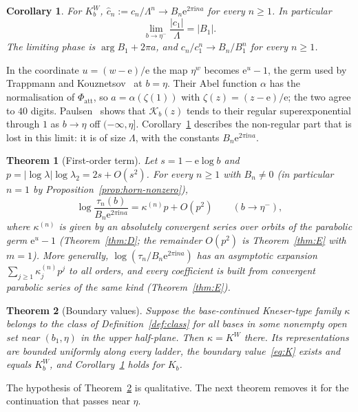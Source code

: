 \documentclass[11pt]{amsart}
\newtheorem{corollary}[theorem]{Corollary}
\newtheorem{maintheorem}{Theorem}
\theoremstyle{definition}
\newcommand{\Kk}{K}
\newcommand{\eee}{\mathrm{e}}
\newcommand{\ii}{\mathrm{i}}
\begin{document}
\begin{corollary}\label{cor:limits}
For $\Kk^W_b$, $\hat c_n:=c_n/\Lambda^n\to B_n\eee^{2\pi\ii na}$ for every $n\ge1$.
In particular
\[
 \lim_{b\to\eta^-}\frac{|c_1|}{\Lambda}=|B_1|.
\]
The limiting phase is $\arg B_1+2\pi a$, and
$c_n/c_1^n\to B_n/B_1^n$ for every $n\ge1$.
\end{corollary}

In the coordinate $u=(w-\eee)/\eee$ the map $\eta^w$ becomes $\eee^u-1$, the
germ used by Trappmann and Kouznetsov~\cite{KouznetsovTrappmann2012} at
$b=\eta$.  Their Abel function $\alpha$ has the normalisation of
$\Phi_{\mathrm{att}}$, so $a=\alpha(\zeta(1))$ with $\zeta(z)=(z-\eee)/\eee$; the two
agree to $40$ digits.  Paulsen~\cite[Prop.~1]{Paulsen2026} shows that $\mathcal K_b(z)$
tends to their regular superexponential through $1$ as $b\to\eta$ off
$(-\infty,\eta]$.  Corollary~\ref{cor:limits} describes the non-regular part that
is lost in this limit: it is of size $\Lambda$, with the constants $B_n\eee^{2\pi\ii na}$.

\begin{maintheorem}[First-order term]\label{mthm:D}
Let $s=1-\eee\log b$ and $p=|\log\lambda|\log\lambda_2=2s+O(s^2)$.  For every
$n\ge1$ with $B_n\ne0$ (in particular $n=1$ by Proposition~\ref{prop:horn-nonzero}),
\[
 \log\frac{\tau_n(b)}{B_n\eee^{2\pi\ii na}}=\kappa^{(n)}p+O(p^{2})\qquad(b\to\eta^-),
\]
where $\kappa^{(n)}$ is given by an absolutely convergent series over orbits of
the parabolic germ $\eee^u-1$ (Theorem~\ref{thm:D}; the remainder $O(p^2)$ is
Theorem~\ref{thm:E} with $m=1$).  More generally,
$\log(\tau_n/B_n\eee^{2\pi\ii na})$ has an asymptotic expansion
$\sum_{j\ge1}\kappa^{(n)}_jp^j$ to all orders, and every coefficient is built from
convergent parabolic series of the same kind (Theorem~\ref{thm:E}).
\end{maintheorem}

\begin{maintheorem}[Boundary values]\label{mthm:C}
Suppose the base-continued Kneser-type family $\kappa$ belongs to the class of
Definition~\ref{def:class} for all bases in some nonempty open set near
$(b_1,\eta)$ in the upper half-plane.  Then $\kappa=\Kk^W$ there.  Its
representations are bounded uniformly along every ladder, the boundary
value~\eqref{eq:K} exists and equals $\Kk^W_b$, and Corollary~\ref{cor:limits}
holds for $\Kk_b$.
\end{maintheorem}

The hypothesis of Theorem~\ref{mthm:C} is qualitative.  The next theorem
removes it for the continuation that passes near $\eta$.
\end{document}
